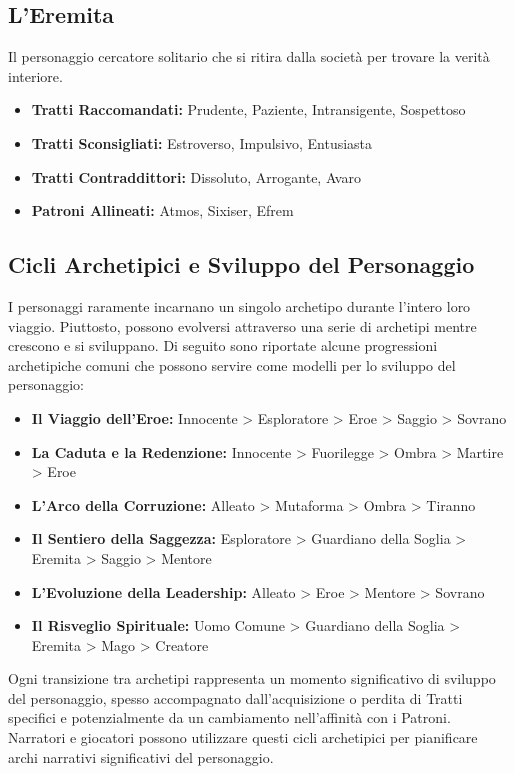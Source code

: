 \begin{multicols}{2}
\subsection*{L'Eremita}
Il personaggio cercatore solitario che si ritira dalla società per trovare la verità interiore.

\noindent\begin{itemize}[leftmargin=*] \setlength{\itemsep}{0pt}
\item \textbf{Tratti Raccomandati:} Prudente, Paziente, Intransigente, Sospettoso
\item \textbf{Tratti Sconsigliati:} Estroverso, Impulsivo, Entusiasta
\item \textbf{Tratti Contraddittori:} Dissoluto, Arrogante, Avaro
\item \textbf{Patroni Allineati:} Atmos, Sixiser, Efrem
\end{itemize}

\subsection*{Cicli Archetipici e Sviluppo del Personaggio}

I personaggi raramente incarnano un singolo archetipo durante l'intero loro viaggio. Piuttosto, possono evolversi attraverso una serie di archetipi mentre crescono e si sviluppano. Di seguito sono riportate alcune progressioni archetipiche comuni che possono servire come modelli per lo sviluppo del personaggio:

\noindent\begin{itemize}[leftmargin=*] \setlength{\itemsep}{0pt}
\item \textbf{Il Viaggio dell'Eroe:} Innocente > Esploratore > Eroe > Saggio > Sovrano
\item \textbf{La Caduta e la Redenzione:} Innocente > Fuorilegge > Ombra > Martire > Eroe
\item \textbf{L'Arco della Corruzione:} Alleato > Mutaforma > Ombra > Tiranno
\item \textbf{Il Sentiero della Saggezza:} Esploratore > Guardiano della Soglia > Eremita > Saggio > Mentore
\item \textbf{L'Evoluzione della Leadership:} Alleato > Eroe > Mentore > Sovrano
\item \textbf{Il Risveglio Spirituale:} Uomo Comune > Guardiano della Soglia > Eremita > Mago > Creatore
\end{itemize}

Ogni transizione tra archetipi rappresenta un momento significativo di sviluppo del personaggio, spesso accompagnato dall'acquisizione o perdita di Tratti specifici e potenzialmente da un cambiamento nell'affinità con i Patroni. Narratori e giocatori possono utilizzare questi cicli archetipici per pianificare archi narrativi significativi del personaggio.


\end{multicols}
